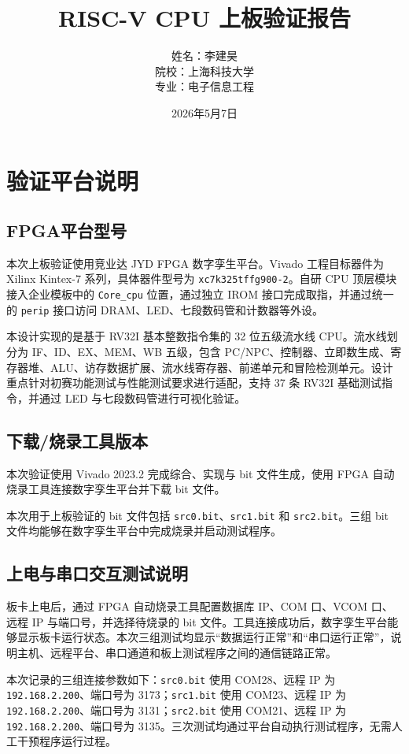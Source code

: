\documentclass[12pt,a4paper]{ctexart}
\title{RISC-V CPU 上板验证报告}
\author{姓名：李建昊\\院校：上海科技大学\\专业：电子信息工程}
\date{2026年5月7日}
\newcommand{\code}[1]{\texttt{#1}}
\begin{document}
\tableofcontents
\newpage

\section{验证平台说明}
\subsection{FPGA平台型号}
本次上板验证使用竞业达 JYD FPGA 数字孪生平台。Vivado 工程目标器件为 Xilinx Kintex-7 系列，具体器件型号为 \code{xc7k325tffg900-2}。自研 CPU 顶层模块接入企业模板中的 \code{Core\_cpu} 位置，通过独立 IROM 接口完成取指，并通过统一的 \code{perip} 接口访问 DRAM、LED、七段数码管和计数器等外设。

本设计实现的是基于 RV32I 基本整数指令集的 32 位五级流水线 CPU。流水线划分为 IF、ID、EX、MEM、WB 五级，包含 PC/NPC、控制器、立即数生成、寄存器堆、ALU、访存数据扩展、流水线寄存器、前递单元和冒险检测单元。设计重点针对初赛功能测试与性能测试要求进行适配，支持 37 条 RV32I 基础测试指令，并通过 LED 与七段数码管进行可视化验证。

\subsection{下载/烧录工具版本}
本次验证使用 Vivado 2023.2 完成综合、实现与 bit 文件生成，使用 FPGA 自动烧录工具连接数字孪生平台并下载 bit 文件。

本次用于上板验证的 bit 文件包括 \code{src0.bit}、\code{src1.bit} 和 \code{src2.bit}。三组 bit 文件均能够在数字孪生平台中完成烧录并启动测试程序。

\subsection{上电与串口交互测试说明}
板卡上电后，通过 FPGA 自动烧录工具配置数据库 IP、COM 口、VCOM 口、远程 IP 与端口号，并选择待烧录的 bit 文件。工具连接成功后，数字孪生平台能够显示板卡运行状态。本次三组测试均显示“数据运行正常”和“串口运行正常”，说明主机、远程平台、串口通道和板上测试程序之间的通信链路正常。

本次记录的三组连接参数如下：\code{src0.bit} 使用 COM28、远程 IP 为 \code{192.168.2.200}、端口号为 3173；\code{src1.bit} 使用 COM23、远程 IP 为 \code{192.168.2.200}、端口号为 3131；\code{src2.bit} 使用 COM21、远程 IP 为 \code{192.168.2.200}、端口号为 3135。三次测试均通过平台自动执行测试程序，无需人工干预程序运行过程。
\end{document}
